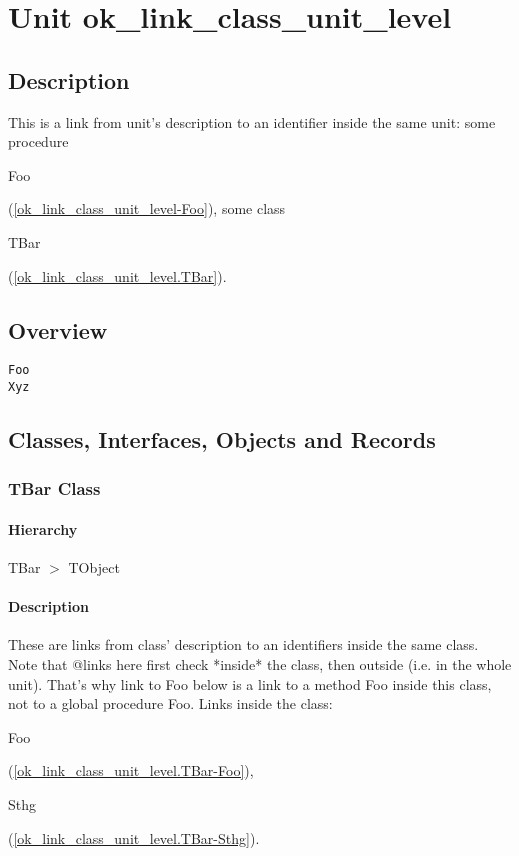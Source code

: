 \documentclass{report}
\begin{document}
\chapter{Unit ok{\_}link{\_}class{\_}unit{\_}level}
\section{Description}
This is a link from unit's description to an identifier inside the same unit: some procedure \begin{ttfamily}Foo\end{ttfamily}(\ref{ok_link_class_unit_level-Foo}), some class \begin{ttfamily}TBar\end{ttfamily}(\ref{ok_link_class_unit_level.TBar}).
\section{Overview}
\begin{description}
\item[\texttt{\begin{ttfamily}TBar\end{ttfamily} Class}]
\end{description}
\begin{description}
\item[\texttt{Foo}]
\item[\texttt{Xyz}]
\end{description}
\section{Classes, Interfaces, Objects and Records}
\subsection*{TBar Class}
\subsubsection*{\large{\textbf{Hierarchy}}\normalsize\hspace{1ex}\hfill}
TBar {$>$} TObject
\subsubsection*{\large{\textbf{Description}}\normalsize\hspace{1ex}\hfill}
These are links from class' description to an identifiers inside the same class. Note that @links here first check *inside* the class, then outside (i.e. in the whole unit). That's why link to Foo below is a link to a method Foo inside this class, not to a global procedure Foo. Links inside the class: \begin{ttfamily}Foo\end{ttfamily}(\ref{ok_link_class_unit_level.TBar-Foo}), \begin{ttfamily}Sthg\end{ttfamily}(\ref{ok_link_class_unit_level.TBar-Sthg}).
\end{document}
